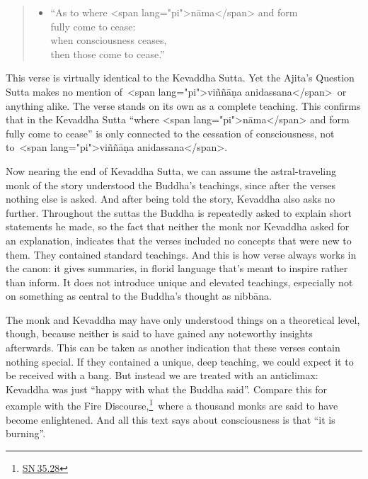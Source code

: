 \documentclass[10pt, openright]{book}
\begin{document}
\begin{quote}


\begin{itemize}

\item[{}]“As to where <span lang="pi">nāma</span> and form \\ fully come to cease: \\ when consciousness ceases, \\ then those come to cease.”

\end{itemize}

\end{quote}
This verse is virtually identical to the Kevaddha Sutta. Yet the Ajita’s Question Sutta makes no mention of <span lang="pi">viññāṇa anidassana</span> or anything alike. The verse stands on its own as a complete teaching. This confirms that in the Kevaddha Sutta “where <span lang="pi">nāma</span> and form fully come to cease” is only connected to the cessation of consciousness, not to <span lang="pi">viññāṇa anidassana</span>.


Now nearing the end of Kevaddha Sutta, we can assume the astral-traveling monk of the story understood the Buddha’s teachings, since after the verses nothing else is asked. And after being told the story, Kevaddha also asks no further. Throughout the suttas the Buddha is repeatedly asked to explain short statements he made, so the fact that neither the monk nor Kevaddha asked for an explanation, indicates that the verses included no concepts that were new to them. They contained standard teachings. And this is how verse always works in the canon: it gives summaries, in florid language that’s meant to inspire rather than inform. It does not introduce unique and elevated teachings, especially not on something as central to the Buddha’s thought as nibbāna.


The monk and Kevaddha may have only understood things on a theoretical level, though, because neither is said to have gained any noteworthy insights afterwards. This can be taken as another indication that these verses contain nothing special. If they contained a unique, deep teaching, we could expect it to be received with a bang. But instead we are treated with an anticlimax: Kevaddha was just “happy with what the Buddha said”. Compare this for example with the Fire Discourse,\footnote {\href{https://suttacentral.net/sn35.28/en/sujato}{SN 35.28}} where a thousand monks are said to have become enlightened. And all this text says about consciousness is that “it is burning”.
\end{document}
